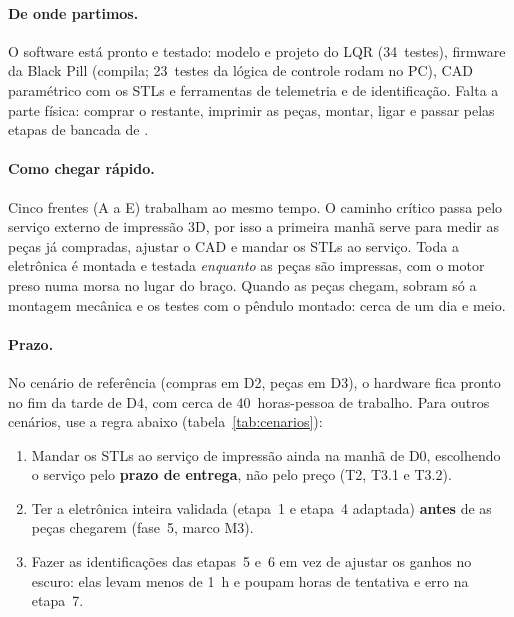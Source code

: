 \documentclass[11pt,a4paper]{article}
\newcommand{\arq}[1]{\path{#1}}                    %
\begin{document}
\paragraph{De onde partimos.} O software está pronto e testado: modelo e projeto do LQR
(34~testes), firmware da Black Pill (compila; 23~testes da lógica de controle rodam no PC),
CAD paramétrico com os STLs e ferramentas de telemetria e de identificação. Falta a parte
física: comprar o restante, imprimir as peças, montar, ligar e passar pelas etapas de
bancada de \arq{docs/testes_bancada.md}.

\paragraph{Como chegar rápido.} Cinco frentes (A a E) trabalham ao mesmo tempo. O caminho
crítico passa pelo serviço externo de impressão 3D, por isso a primeira manhã serve para
medir as peças já compradas, ajustar o CAD e mandar os STLs ao serviço. Toda a eletrônica
é montada e testada \emph{enquanto} as peças são impressas, com o motor preso numa morsa no
lugar do braço. Quando as peças chegam, sobram só a montagem mecânica e os testes com o
pêndulo montado: cerca de um dia e meio.

\paragraph{Prazo.} No cenário de referência (compras em D2, peças em D3), o hardware fica
pronto no fim da tarde de D4, com cerca de 40~horas-pessoa de trabalho. Para outros
cenários, use a regra abaixo (tabela~\ref{tab:cenarios}):

\begin{center}
\end{center}

\begin{dica}
\begin{enumerate}[leftmargin=1.5em]
  \item Mandar os STLs ao serviço de impressão ainda na manhã de D0, escolhendo o serviço
    pelo \textbf{prazo de entrega}, não pelo preço (T2, T3.1 e T3.2).
  \item Ter a eletrônica inteira validada (etapa~1 e etapa~4 adaptada) \textbf{antes} de as
    peças chegarem (fase~5, marco M3).
  \item Fazer as identificações das etapas~5 e~6 em vez de ajustar os ganhos no escuro: elas
    levam menos de 1~h e poupam horas de tentativa e erro na etapa~7.
\end{enumerate}
\end{dica}
\end{document}
